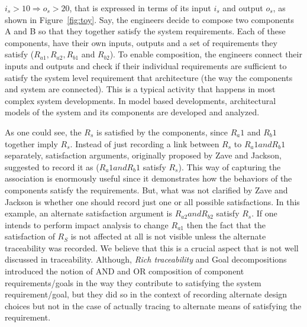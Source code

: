  \emph{$ i_s > 10 \Rightarrow o_s > 20 $}, that is expressed in terms of its  input $i_s$ and output $o_s$, as shown in Figure~\ref{fig:toy}. Say, the engineers decide to compose two components A and B so that they together satisfy the system requirements. Each of these components, have their own inputs, outputs and a set of requirements they satisfy ($R_{a1}, R_{a2}, R_{b1}$ and $R_{b2}$). To enable composition, the engineers connect their inputs and outputs and check if their individual requirements are sufficient to satisfy the system level requirement that architecture (the way the components and system are connected). This is a typical activity that happens in most complex system developments. In model based developments, architectural models of the system and its components are developed and analyzed.



As one could see, the $R_s$ is satisfied by the components, since $R_a1$ and $R_b1$ together imply $R_s$. Instead of just recording a link between  $R_s$ to $R_a1 and R_b1$ separately, satisfaction arguments, originally proposed by Zave and Jackson, suggested to record it as ($R_a1 and R_b1$ satisfy $R_s$). This way of capturing the association is enormously useful since it demonstrates how the behaviors of the components satisfy the requirements. But, what was not clarified by Zave and Jackson is whether one should record just one or all possible satisfactions. In this example, an alternate satisfaction argument is $R_{a2} and R_{b2}$ satisfy $R_s$. If one intends to perform impact analysis to change $R_{a1}$ then the fact that the satisfaction of $R_S$ is not affected at all is not visible unless the alternate traceability was recorded. We believe that this is a crucial aspect that is not well discussed in traceability. Although, \emph{Rich traceability} and Goal decompositions introduced the notion of AND and OR composition of component requirements/goals in the way they contribute to satisfying the system requirement/goal, but they did so in the context of recording alternate design choices but not in the case of actually tracing to alternate means of satisfying the requirement.




